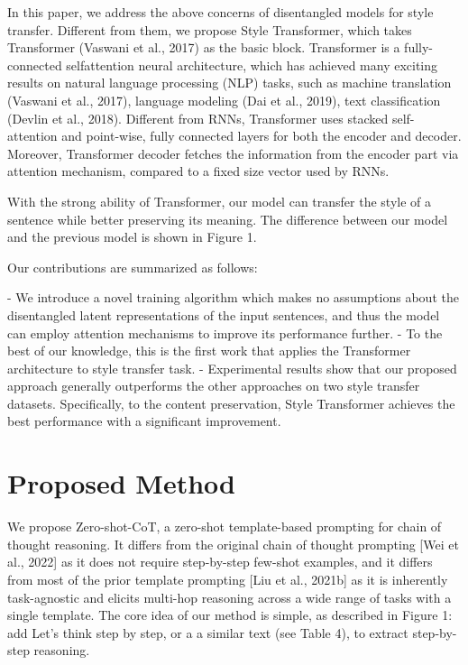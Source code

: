 \documentclass{article}
\begin{document}
In this paper, we address the above concerns of disentangled models for style transfer. Different from them, we propose Style Transformer, which takes Transformer (Vaswani et al., 2017) as the basic block. Transformer is a fully-connected selfattention neural architecture, which has achieved many exciting results on natural language processing (NLP) tasks, such as machine translation (Vaswani et al., 2017), language modeling (Dai et al., 2019), text classification (Devlin et al., 2018). Different from RNNs, Transformer uses stacked self-attention and point-wise, fully connected layers for both the encoder and decoder. Moreover, Transformer decoder fetches the information from the encoder part via attention mechanism, compared to a fixed size vector used by RNNs.

With the strong ability of Transformer, our model can transfer the style of a sentence while better preserving its meaning. The difference between our model and the previous model is shown in Figure 1.

Our contributions are summarized as follows:

- We introduce a novel training algorithm
which makes no assumptions about the disentangled latent representations of the input
sentences, and thus the model can employ
attention mechanisms to improve its performance further.
- To the best of our knowledge, this is the first
work that applies the Transformer architecture to style transfer task.
- Experimental results show that our proposed
approach generally outperforms the other
approaches on two style transfer datasets.
Specifically, to the content preservation,
Style Transformer achieves the best performance with a significant improvement.

\section{Proposed Method}
We propose Zero-shot-CoT, a zero-shot template-based prompting for chain of thought reasoning. It differs from the original chain of thought prompting [Wei et al., 2022] as it does not require step-by-step few-shot examples, and it differs from most of the prior template prompting [Liu et al., 2021b] as it is inherently task-agnostic and elicits multi-hop reasoning across a wide range of tasks with a single template. The core idea of our method is simple, as described in Figure 1: add Let’s think step by step, or a a similar text (see Table 4), to extract step-by-step reasoning.
\end{document}

